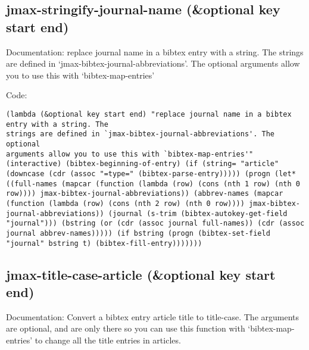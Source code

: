 \documentclass[11pt]{article}
\begin{document}
\subsection{jmax-stringify-journal-name (\&optional key start end)}
\label{sec-2-9}
Documentation: replace journal name in a bibtex entry with a string. The
strings are defined in `jmax-bibtex-journal-abbreviations'. The optional
arguments allow you to use this with `bibtex-map-entries'

Code:
\begin{verbatim}
(lambda (&optional key start end) "replace journal name in a bibtex entry with a string. The
strings are defined in `jmax-bibtex-journal-abbreviations'. The optional
arguments allow you to use this with `bibtex-map-entries'" (interactive) (bibtex-beginning-of-entry) (if (string= "article" (downcase (cdr (assoc "=type=" (bibtex-parse-entry))))) (progn (let* ((full-names (mapcar (function (lambda (row) (cons (nth 1 row) (nth 0 row)))) jmax-bibtex-journal-abbreviations)) (abbrev-names (mapcar (function (lambda (row) (cons (nth 2 row) (nth 0 row)))) jmax-bibtex-journal-abbreviations)) (journal (s-trim (bibtex-autokey-get-field "journal"))) (bstring (or (cdr (assoc journal full-names)) (cdr (assoc journal abbrev-names))))) (if bstring (progn (bibtex-set-field "journal" bstring t) (bibtex-fill-entry)))))))
\end{verbatim}
\subsection{jmax-title-case-article (\&optional key start end)}
\label{sec-2-10}
Documentation: Convert a bibtex entry article title to title-case. The
arguments are optional, and are only there so you can use this
function with `bibtex-map-entries' to change all the title
entries in articles.
\end{document}
